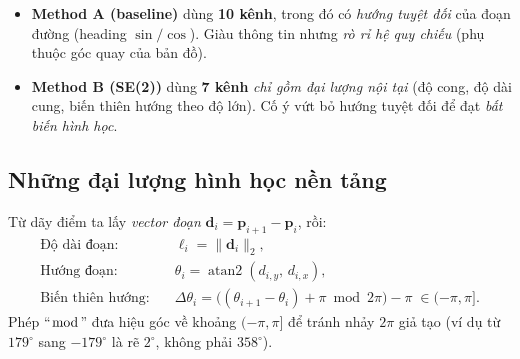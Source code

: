 \documentclass[11pt]{article}
\newcommand{\pt}{\mathbf{p}}
\theoremstyle{definition}
\newcommand{\chA}[1]{\textcolor{cA}{\textbf{#1}}}
\newcommand{\chB}[1]{\textcolor{cB}{\textbf{#1}}}
\begin{document}
\begin{itemize}[leftmargin=1.4em]
\item \chA{Method A (baseline)} dùng \textbf{10 kênh}, trong đó có
\emph{hướng tuyệt đối} của đoạn đường (heading $\sin/\cos$). Giàu thông tin nhưng
\emph{rò rỉ hệ quy chiếu} (phụ thuộc góc quay của bản đồ).
\item \chB{Method B (SE(2))} dùng \textbf{7 kênh} \emph{chỉ gồm đại lượng nội
tại} (độ cong, độ dài cung, biến thiên hướng theo độ lớn). Cố ý vứt bỏ hướng
tuyệt đối để đạt \emph{bất biến hình học}.
\end{itemize}

\subsection{Những đại lượng hình học nền tảng}
Từ dãy điểm ta lấy \emph{vector đoạn} $\mathbf{d}_i=\pt_{i+1}-\pt_i$, rồi:
\begin{align}
\text{Độ dài đoạn:}\quad & \ell_i = \lVert \mathbf{d}_i\rVert_2, \\
\text{Hướng đoạn:}\quad & \theta_i = \operatorname{atan2}(d_{i,y},\,d_{i,x}), \\
\text{Biến thiên hướng:}\quad & \Delta\theta_i =
\big((\theta_{i+1}-\theta_i)+\pi \bmod 2\pi\big)-\pi
\;\in(-\pi,\pi].
\end{align}
Phép ``$\bmod$'' đưa hiệu góc về khoảng $(-\pi,\pi]$ để tránh nhảy $2\pi$ giả
tạo (ví dụ từ $179^\circ$ sang $-179^\circ$ là rẽ $2^\circ$, không phải
$358^\circ$).
\end{document}
